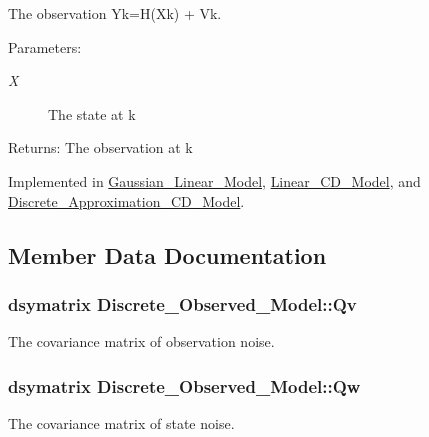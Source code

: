 The observation Yk=H(Xk) + Vk. 

\begin{Desc}
\item[Parameters:]
\begin{description}
\item[{\em X}]The state at k\end{description}
\end{Desc}
\begin{Desc}
\item[Returns:]The observation at k \end{Desc}


Implemented in \hyperlink{class_gaussian___linear___model_a6ac01291543509b33bad1160ad7e498}{Gaussian\_\-Linear\_\-Model}, \hyperlink{class_linear___c_d___model_79ddecd171ea3725ed37ea689e53bf96}{Linear\_\-CD\_\-Model}, and \hyperlink{class_discrete___approximation___c_d___model_fe110c215bf843377888ad5ba823088e}{Discrete\_\-Approximation\_\-CD\_\-Model}.

\subsection{Member Data Documentation}
\hypertarget{class_discrete___observed___model_19b3aea69446339de9b2ae23bd8012c5}{
\subsubsection[{Qv}]{\setlength{\rightskip}{0pt plus 5cm}dsymatrix {\bf Discrete\_\-Observed\_\-Model::Qv}}}
\label{class_discrete___observed___model_19b3aea69446339de9b2ae23bd8012c5}


The covariance matrix of observation noise. 

\hypertarget{class_discrete___observed___model_970cc92956a6f09a0e65d0f572aa7588}{
\subsubsection[{Qw}]{\setlength{\rightskip}{0pt plus 5cm}dsymatrix {\bf Discrete\_\-Observed\_\-Model::Qw}}}
\label{class_discrete___observed___model_970cc92956a6f09a0e65d0f572aa7588}


The covariance matrix of state noise. 

